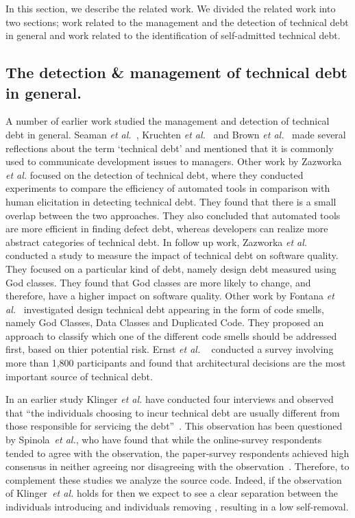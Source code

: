 
In this section, we describe the related work. We divided the related work into two sections; work related to the management and the detection of technical debt in general and work related to the identification of self-admitted technical debt.

\subsection{The detection \& management of technical debt in general.} A number of earlier work studied the management and detection of technical debt in general. Seaman \textit{et al.}~\cite{Seaman2011}, Kruchten \textit{et al.}~\cite{Kruchten2013IWMTD} and Brown \textit{et al.}~\cite{Brown2010MTD} made several reflections about the term `technical debt' and mentioned that it is commonly used to communicate development issues to managers. Other work by Zazworka \textit{et al.} \cite{Zazworka2013EASE} focused on the detection of technical debt, where they conducted experiments to compare the efficiency of automated tools in comparison with human elicitation in detecting technical debt. They found that there is a small overlap between the two approaches. They also concluded that automated tools are more efficient in finding defect debt, whereas developers can realize more abstract categories of technical debt. In follow up work, Zazworka \textit{et al.}~\cite{Zazworka2011MTD} conducted a study to measure the impact of technical debt on software quality. They focused on a particular kind of debt, namely design debt measured using God classes. They found that God classes are more likely to change, and therefore, have a higher impact on software quality. Other work by Fontana \textit{et al.}~\cite{Fontana2012MTD} investigated design technical debt appearing in the form of code smells, namely God Classes, Data Classes and Duplicated Code. They proposed an approach to classify which one of the different code smells should be addressed first, based on thier potential risk. Ernst \textit{et al.} ~\cite{Ernst2015FSE} conducted a survey involving more than 1,800 participants and found that architectural decisions are the most important source of technical debt.



In an earlier study Klinger \textit{et al.} have conducted four interviews and observed that ``the individuals choosing to incur technical debt are usually different from those responsible for servicing the debt''~\cite{Klinger:etal}. 
This observation has been questioned by Spinola~\textit{et al.}, who have found that while the online-survey respondents tended to agree with the observation, the paper-survey respondents achieved high consensus in neither agreeing nor disagreeing with the observation~\cite{Spinola:etal}. Therefore, to complement these studies we analyze the source code.
Indeed, if the observation of Klinger~\textit{et al.} holds for \SATD then we expect to see a clear separation between the individuals introducing \SATD and individuals removing \SATD, resulting in a low \SATD self-removal.

